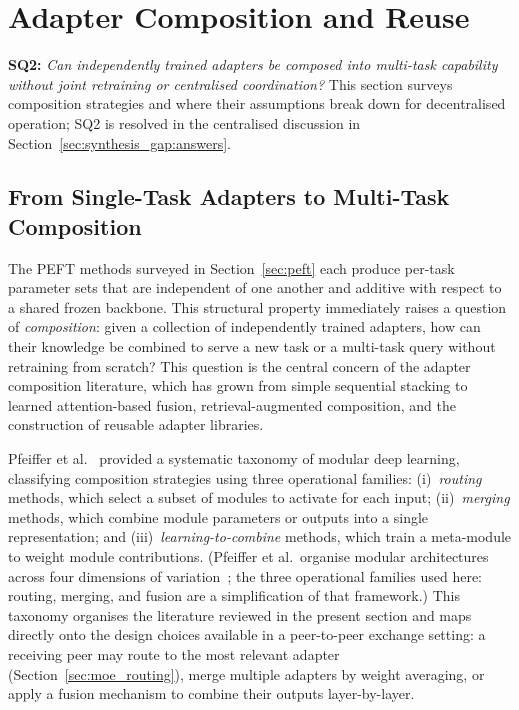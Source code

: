 \section{Adapter Composition and Reuse}
\label{sec:adapter_composition}

\noindent\textbf{SQ2:} \textit{Can independently trained adapters be composed
into multi-task capability without joint retraining or centralised
coordination?} This section surveys composition strategies and where their
assumptions break down for decentralised operation; SQ2 is resolved in the
centralised discussion in Section~\ref{sec:synthesis_gap:answers}.

\subsection{From Single-Task Adapters to Multi-Task Composition}
\label{sec:adapter_composition:intro}

The PEFT methods surveyed in Section~\ref{sec:peft} each produce per-task parameter
sets that are independent of one another and additive with respect to a shared frozen
backbone. This structural property immediately raises a question of \textit{composition}:
given a collection of independently trained adapters, how can their knowledge be combined
to serve a new task or a multi-task query without retraining from scratch? This question
is the central concern of the adapter composition literature, which has grown from simple
sequential stacking to learned attention-based fusion, retrieval-augmented composition,
and the construction of reusable adapter libraries.

Pfeiffer et al.~\cite{PfeifferModular2023} provided a systematic taxonomy of modular deep learning, classifying
composition strategies using three operational families: (i)~\textit{routing} methods, which select
a subset of modules to activate for each input; (ii)~\textit{merging} methods, which
combine module parameters or outputs into a single representation; and
(iii)~\textit{learning-to-combine} methods, which train a meta-module to weight module
contributions. (Pfeiffer et al.\ organise modular architectures across four dimensions of
variation~\cite{PfeifferModular2023}; the three operational families used here: routing, merging,
and fusion are a simplification of that framework.) This taxonomy organises the literature
reviewed in the present section and maps directly onto the design choices available in a
peer-to-peer exchange setting: a receiving peer may route to the most relevant adapter
(Section~\ref{sec:moe_routing}), merge multiple adapters by weight averaging, or apply a
fusion mechanism to combine their outputs layer-by-layer.

